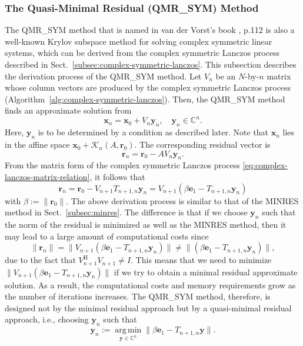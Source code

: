 \subsubsection{{The Quasi-Minimal Residual (QMR\_SYM) Method}}\label{subsec:qmr-sym}
{The QMR\_SYM method  that is named in van der Vorst's book , p.112 is also a well-known Krylov subspace method for solving complex symmetric linear systems, which can be derived from the complex symmetric Lanczos process described in Sect.\ \ref{subsec:complex-symmetric-lanczos}.}
{This subsection describes the derivation process of the QMR\_SYM method. Let $V_n$ be an $N$-by-$n$ matrix whose column vectors are produced by the complex symmetric Lanczos process (Algorithm\ \ref{alg:complex-symmetric-lanczos}). Then, the QMR\_SYM method finds an approximate solution from}
\begin{equation}\label{eq:qmr-sym-affine-solution}\bm x_n=\bm x_0+V_n\bm y_n,\quad\bm y_n\in\mathbb C^n.\end{equation}
{Here, $\bm y_n$ is to be determined by a condition as described later. Note that $\bm x_n$ lies in the affine space $\bm x_0+\mathcal K_n(A,\bm r_0)$. The corresponding residual vector is}
\[\bm r_n=\bm r_0-AV_n\bm y_n.\]
{From the matrix form of the complex symmetric Lanczos process \eqref{eq:complex-lanczos-matrix-relation}, it follows that}
\[\bm r_n=\bm r_0-V_{n+1}T_{n+1,n}\bm y_n=V_{n+1}(\beta\bm e_1-T_{n+1,n}\bm y_n)\]
{with $\beta:=\|\bm r_0\|$. The above derivation process is similar to that of the MINRES method in Sect.\ \ref{subsec:minres}. The difference is that if we choose $\bm y_n$ such that the norm of the residual is minimized as well as the MINRES method, then it may lead to a large amount of computational costs since}
\begin{equation}\label{eq:qmr-sym-residual-norm-distinction}
\|\bm r_n\|=\|V_{n+1}(\beta\bm e_1-T_{n+1,n}\bm y_n)\|\ne\|(\beta\bm e_1-T_{n+1,n}\bm y_n)\|,
\end{equation}
{due to the fact that $V_{n+1}^{\mathrm H}V_{n+1}\ne I$. This means that we need to minimize $\|V_{n+1}(\beta\bm e_1-T_{n+1,n}\bm y_n)\|$ if we try to obtain a minimal residual approximate solution. As a result, the computational costs and memory requirements grow as the number of iterations increases.}
{The QMR\_SYM method, therefore, is designed not by the minimal residual approach but by a quasi-minimal residual approach, i.e., choosing $\bm y_n$ such that}
\begin{equation}\label{eq:qmr-sym-projected-minimization}\bm y_n:=\operatorname*{arg\,min}_{\bm y\in\mathbb C^n}\|\beta\bm e_1-T_{n+1,n}\bm y\|.\end{equation}
